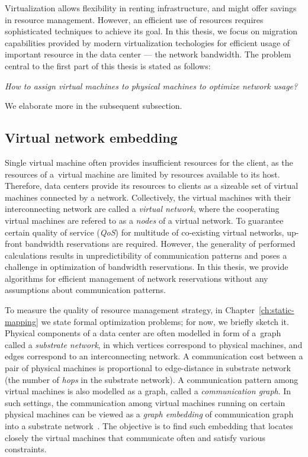 Virtualization allows flexibility in renting infrastructure, and might offer savings in resource management.
However, an efficient use of resources requires sophisticated techniques to achieve its goal.
In this thesis, we focus on migration capabilities provided by modern virtualization techologies for efficient usage of important resource in the data center --- the network bandwidth.
The problem central to the first part of this thesis is stated as follows:

\begin{center}
  \emph{How to assign virtual machines to physical machines to optimize network
  usage?}
\end{center}

We elaborate more in the subsequent subsection.

\subsection{Virtual network embedding}

Single virtual machine often provides insufficient resources for the client, as the resources of a~virtual machine are limited by resources available to its host.
Therefore, data centers provide its resources to clients as a sizeable set of virtual machines connected by a network.
Collectively, the virtual machines with their interconnecting network are called a \emph{virtual network}, where the cooperating virtual machines are refered to as a \emph{nodes} of a virtual network.
To guarantee certain quality of service (\emph{QoS}) for multitude of co-existing virtual networks, up-front bandwidth reservations are required.
However, the generality of performed calculations results in unpredictibility of communication patterns and poses a challenge in optimization of bandwidth reservations.
In this thesis, we provide algorithms for efficient management of network reservations without any assumptions about communication patterns.

To measure the quality of resource management strategy, in Chapter~\ref{ch:static-mapping} we state formal optimization problems; for now, we briefly sketch it.
Physical components of a data center are often modelled in form of a~graph called a \emph{substrate network}, in which vertices correspond to physical machines, and edges correspond to an interconnecting network.
A communication cost between a pair of physical machines is proportional to edge-distance in substrate network (the number of \emph{hops} in the substrate network).
A communication pattern among virtual machines is also modelled as a graph, called a \emph{communication graph}.
In such settings, the communication among virtual machines running on certain physical machines can be viewed as a \emph{graph embedding} of communication graph into a substrate network~\cite{Goyal2008,gupta2001provisioning}.
The objective is to find such embedding that locates closely the virtual machines that communicate often and satisfy various constraints.

